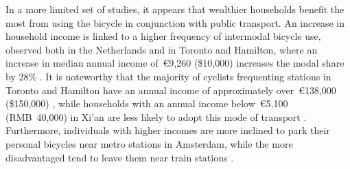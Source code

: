 \begin{refsegment}
In a more limited set of studies, it appears that wealthier households benefit the most from using the bicycle in conjunction with public transport. An increase in household income is linked to a higher frequency of intermodal bicycle use, observed both in the Netherlands \textcolor{blue}{\autocite[15]{shelat_analysing_2018}} and in Toronto and Hamilton, where an increase in median annual income of~\euro9,260 (\$10,000) increases the modal share by 28\% \textcolor{blue}{\autocite[2171]{chan_factors_2020}}. It is noteworthy that the majority of cyclists frequenting stations in Toronto and Hamilton have an annual income of approximately over~\euro138,000 (\$150,000) \textcolor{blue}{\autocite[378]{ravensbergen_biking_2018}}, while households with an annual income below~\euro5,100 (RMB~40,000) in Xi'an are less likely to adopt this mode of transport \textcolor{blue}{\autocite[172]{yang_bike-and-ride_2014}}. Furthermore, individuals with higher incomes are more inclined to park their personal bicycles near metro stations in Amsterdam, while the more disadvantaged tend to leave them near train stations \textcolor{blue}{\autocite[344]{kampen_bicycle_2021}}.%


\end{refsegment}
